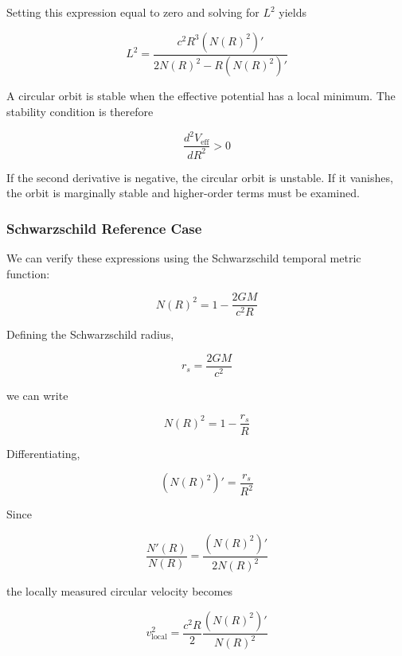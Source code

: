 \documentclass[pdflatex,sn-mathphys-num]{sn-jnl}%
\theoremstyle{thmstyleone}%
\theoremstyle{thmstyletwo}%
\theoremstyle{thmstylethree}%
\begin{document}
\begin{appendices}
Setting this expression equal to zero and solving for $L^2$ yields

\begin{equation}
\boxed{
L^2
=
\frac{
c^2R^3\left(N(R)^2\right)'
}{
2N(R)^2-R\left(N(R)^2\right)'
}
}
\end{equation}

A circular orbit is stable when the effective potential has a local minimum. The stability condition is therefore

\begin{equation}
\boxed{
\frac{d^2V_{\mathrm{eff}}}{dR^2}>0
}
\end{equation}

If the second derivative is negative, the circular orbit is unstable. If it vanishes, the orbit is marginally stable and higher-order terms must be examined.

\subsubsection{Schwarzschild Reference Case}

We can verify these expressions using the Schwarzschild temporal metric function:

\begin{equation}
N(R)^2
=
1-\frac{2GM}{c^2R}
\end{equation}

Defining the Schwarzschild radius,

\begin{equation}
r_s=\frac{2GM}{c^2}
\end{equation}

we can write

\begin{equation}
N(R)^2=1-\frac{r_s}{R}
\end{equation}

Differentiating,

\begin{equation}
\left(N(R)^2\right)'
=
\frac{r_s}{R^2}
\end{equation}

Since

\begin{equation}
\frac{N'(R)}{N(R)}
=
\frac{\left(N(R)^2\right)'}{2N(R)^2}
\end{equation}

the locally measured circular velocity becomes

\begin{equation}
v_{\mathrm{local}}^2
=
\frac{c^2R}{2}
\frac{\left(N(R)^2\right)'}{N(R)^2}
\end{equation}


\end{appendices}
\end{document}

